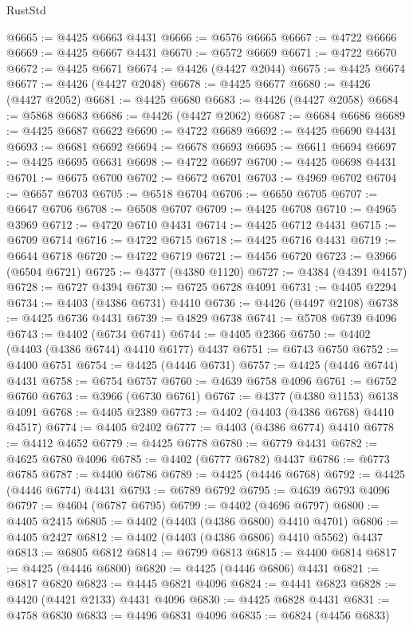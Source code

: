 \begin{lexlean}{RustStd}
\begin{coremodule}
@6665 := @4425 @6663 @4431
@6666 := @6576 @6665
@6667 := @4722 @6666
@6669 := @4425 @6667 @4431
@6670 := @6572 @6669
@6671 := @4722 @6670
@6672 := @4425 @6671
@6674 := @4426 (@4427 @2044)
@6675 := @4425 @6674
@6677 := @4426 (@4427 @2048)
@6678 := @4425 @6677
@6680 := @4426 (@4427 @2052)
@6681 := @4425 @6680
@6683 := @4426 (@4427 @2058)
@6684 := @5868 @6683
@6686 := @4426 (@4427 @2062)
@6687 := @6684 @6686
@6689 := @4425 @6687 @6622
@6690 := @4722 @6689
@6692 := @4425 @6690 @4431
@6693 := @6681 @6692
@6694 := @6678 @6693
@6695 := @6611 @6694
@6697 := @4425 @6695 @6631
@6698 := @4722 @6697
@6700 := @4425 @6698 @4431
@6701 := @6675 @6700
@6702 := @6672 @6701
@6703 := @4969 @6702
@6704 := @6657 @6703
@6705 := @6518 @6704
@6706 := @6650 @6705
@6707 := @6647 @6706
@6708 := @6508 @6707
@6709 := @4425 @6708
@6710 := @4965 @3969
@6712 := @4720 @6710 @4431
@6714 := @4425 @6712 @4431
@6715 := @6709 @6714
@6716 := @4722 @6715
@6718 := @4425 @6716 @4431
@6719 := @6644 @6718
@6720 := @4722 @6719
@6721 := @4456 @6720
@6723 := @3966 (@6504 @6721)
@6725 := @4377 (@4380 @1120)
@6727 := @4384 (@4391 @4157)
@6728 := @6727 @4394
@6730 := @6725 @6728 @4091
@6731 := @4405 @2294
@6734 := @4403 (@4386 @6731) @4410
@6736 := @4426 (@4497 @2108)
@6738 := @4425 @6736 @4431
@6739 := @4829 @6738
@6741 := @5708 @6739 @4096
@6743 := @4402 (@6734 @6741)
@6744 := @4405 @2366
@6750 := @4402 (@4403 (@4386 @6744) @4410 @6177) @4437
@6751 := @6743 @6750
@6752 := @4400 @6751
@6754 := @4425 (@4446 @6731)
@6757 := @4425 (@4446 @6744) @4431
@6758 := @6754 @6757
@6760 := @4639 @6758 @4096
@6761 := @6752 @6760
@6763 := @3966 (@6730 @6761)
@6767 := @4377 (@4380 @1153) @6138 @4091
@6768 := @4405 @2389
@6773 := @4402 (@4403 (@4386 @6768) @4410 @4517)
@6774 := @4405 @2402
@6777 := @4403 (@4386 @6774) @4410
@6778 := @4412 @4652
@6779 := @4425 @6778
@6780 := @6779 @4431
@6782 := @4625 @6780 @4096
@6785 := @4402 (@6777 @6782) @4437
@6786 := @6773 @6785
@6787 := @4400 @6786
@6789 := @4425 (@4446 @6768)
@6792 := @4425 (@4446 @6774) @4431
@6793 := @6789 @6792
@6795 := @4639 @6793 @4096
@6797 := @4604 (@6787 @6795)
@6799 := @4402 (@4696 @6797)
@6800 := @4405 @2415
@6805 := @4402 (@4403 (@4386 @6800) @4410 @4701)
@6806 := @4405 @2427
@6812 := @4402 (@4403 (@4386 @6806) @4410 @5562) @4437
@6813 := @6805 @6812
@6814 := @6799 @6813
@6815 := @4400 @6814
@6817 := @4425 (@4446 @6800)
@6820 := @4425 (@4446 @6806) @4431
@6821 := @6817 @6820
@6823 := @4445 @6821 @4096
@6824 := @4441 @6823
@6828 := @4420 (@4421 @2133) @4431 @4096
@6830 := @4425 @6828 @4431
@6831 := @4758 @6830
@6833 := @4496 @6831 @4096
@6835 := @6824 (@4456 @6833)

\end{coremodule}
\end{lexlean}
